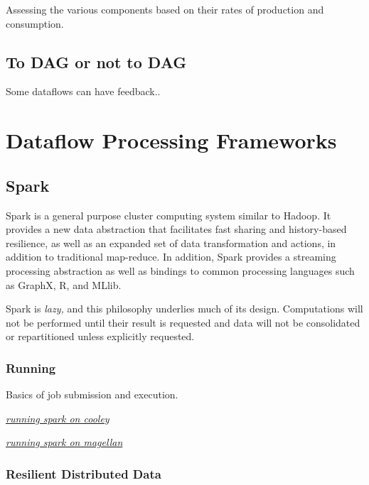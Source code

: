 \documentclass{sig-alternate}
\begin{document}
Assessing the various components based on their rates of production and
consumption.

\subsection{To DAG or not to DAG}\label{to-dag-or-not-to-dag}

Some dataflows can have feedback..

\section{Dataflow Processing
Frameworks}\label{dataflow-processing-frameworks}

\subsection{Spark}\label{spark}

Spark is a general purpose cluster computing system similar to Hadoop.
It provides a new data abstraction that facilitates fast sharing and
history-based resilience, as well as an expanded set of data
transformation and actions, in addition to traditional map-reduce. In
addition, Spark provides a streaming processing abstraction as well as
bindings to common processing languages such as GraphX, R, and MLlib.

Spark is \emph{lazy,} and this philosophy underlies much of its design.
Computations will not be performed until their result is requested and
data will not be consolidated or repartitioned unless explicitly
requested.

\subsubsection{Running}\label{running}

Basics of job submission and execution.

\href{https://docs.google.com/document/d/1fq3z1-oEcCBhjKA__vl8LsVm3-uArJik7YFLYvYoN1Y/edit?usp=sharing}{\emph{running
spark on cooley}}

\href{https://docs.google.com/document/d/1lyzEHap1EznES0DKiMa3fsalepqPD6vnbZqSEMjCVPQ/edit?usp=sharing}{\emph{running
spark on magellan}}

\subsubsection{Resilient Distributed
Data}\label{resilient-distributed-data}
\end{document}
